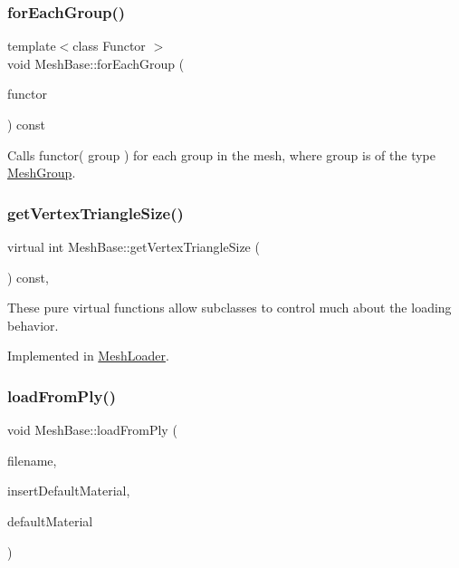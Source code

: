 \subsubsection{\texorpdfstring{for\+Each\+Group()}{forEachGroup()}}
{\footnotesize\ttfamily template$<$class Functor $>$ \\
void Mesh\+Base\+::for\+Each\+Group (\begin{DoxyParamCaption}\item[{Functor}]{functor }\end{DoxyParamCaption}) const}

Calls functor( group ) for each group in the mesh, where \textquotesingle{}group\textquotesingle{} is of the type \hyperlink{class_mesh_group}{Mesh\+Group}. \mbox{\label{class_mesh_base_a508fde807d380849192391f28465fee4}} 
\subsubsection{\texorpdfstring{get\+Vertex\+Triangle\+Size()}{getVertexTriangleSize()}}
{\footnotesize\ttfamily virtual int Mesh\+Base\+::get\+Vertex\+Triangle\+Size (\begin{DoxyParamCaption}{ }\end{DoxyParamCaption}) const\hspace{0.3cm}{\ttfamily [protected]}, {}}

These pure virtual functions allow subclasses to control much about the loading behavior. 

Implemented in \hyperlink{class_mesh_loader_a3e228f5e2fbb1261cd76871ee07e4f58}{Mesh\+Loader}.

\mbox{\label{class_mesh_base_a19e620f5497a82ac5508ee5fa2a8adce}} 
\subsubsection{\texorpdfstring{load\+From\+Ply()}{loadFromPly()}}
{\footnotesize\ttfamily void Mesh\+Base\+::load\+From\+Ply (\begin{DoxyParamCaption}\item[{const std\+::string \&}]{filename,  }\item[{bool}]{insert\+Default\+Material,  }\item[{const \hyperlink{class_mesh_material_params}{Mesh\+Material\+Params} \&}]{default\+Material }\end{DoxyParamCaption})}

